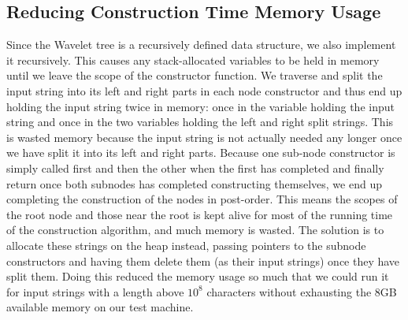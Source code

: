 \subsection{Reducing Construction Time Memory Usage}
Since the Wavelet tree is a recursively defined data structure, we also implement it recursively.
This causes any stack-allocated variables to be held in memory until we leave the scope of the constructor function.
We traverse and split the input string into its left and right parts in each node constructor and thus end up holding the input string twice in memory: once in the variable holding the input string and once in the two variables holding the left and right split strings.
This is wasted memory because the input string is not actually needed any longer once we have split it into its left and right parts.
Because one sub-node constructor is simply called first and then the other when the first has completed and finally return once both subnodes has completed constructing themselves, we end up completing the construction of the nodes in post-order.
This means the scopes of the root node and those near the root is kept alive for most of the running time of the construction algorithm, and much memory is wasted.
The solution is to allocate these strings on the heap instead, passing pointers to the subnode constructors and having them delete them (as their input strings) once they have split them.
Doing this reduced the memory usage so much that we could run it for input strings with a length above $10^8$ characters without exhausting the 8GB available memory on our test machine.


